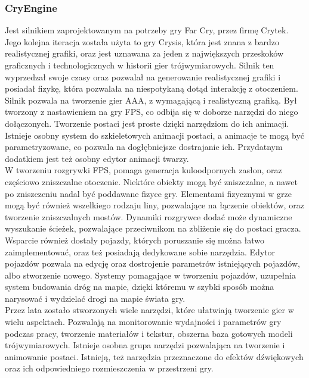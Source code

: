 \documentclass{article} %
\begin{document}
        \subsubsection*{CryEngine}
        Jest silnikiem zaprojektowanym na potrzeby gry Far Cry, przez firmę Crytek. Jego kolejna iteracja została użyta to gry Crysis, która jest znana z bardzo realistycznej grafiki, oraz jest uznawana za jeden z największych przeskoków graficznych i technologicznych w historii gier trójwymiarowych. Silnik ten wyprzedzał swoje czasy oraz pozwalał na generowanie realistycznej grafiki i posiadał fizykę, która pozwalała na niespotykaną dotąd interakcję z otoczeniem. 
        \\
        
        Silnik pozwala na tworzenie gier AAA, z wymagającą i realistyczną grafiką. Był tworzony z nastawieniem na gry FPS, co odbija się w doborze narzędzi do niego dołączonych. Tworzenie postaci jest proste dzięki narzędziom do ich animacji. Istnieje osobny system do szkieletowych animacji postaci, a animacje te mogą być parametryzowane, co pozwala na dogłębniejsze dostrajanie ich. Przydatnym dodatkiem jest też osobny edytor animacji twarzy.
        \\
        
        W tworzeniu rozgrywki FPS, pomaga generacja kuloodpornych zasłon, oraz częściowo zniszczalne otoczenie. Niektóre obiekty mogą być zniszczalne, a nawet po zniszczeniu nadal być poddawane fizyce gry. Elementami fizycznymi w grze mogą być również wszelkiego rodzaju liny, pozwalające na łączenie obiektów, oraz tworzenie zniszczalnych mostów. Dynamiki rozgrywce dodać może dynamiczne wyszukanie ścieżek, pozwalające przeciwnikom na zbliżenie się do postaci gracza.
        \\
        
        Wsparcie również dostały pojazdy, których poruszanie się można łatwo zaimplementować, oraz też posiadają dedykowane sobie narzędzia. Edytor pojazdów pozwala na edycję oraz dostrojenie parametrów istniejących pojazdów, albo stworzenie nowego. Systemy pomagające w tworzeniu pojazdów, uzupełnia system budowania dróg na mapie, dzięki któremu w szybki sposób można narysować i wydzielać drogi na mapie świata gry.
        \\
        
        Przez lata zostało stworzonych wiele narzędzi, które ułatwiają tworzenie gier w wielu aspektach. Pozwalają na monitorowanie wydajności i parametrów gry podczas pracy, tworzenie materiałów i tekstur, obszerna baza gotowych modeli trójwymiarowych. Istnieje osobna grupa narzędzi pozwalająca na tworzenie i animowanie postaci. Istnieją, też narzędzia przeznaczone do efektów dźwiękowych oraz ich odpowiedniego rozmieszczenia w przestrzeni gry.
        \\
        
\end{document}
